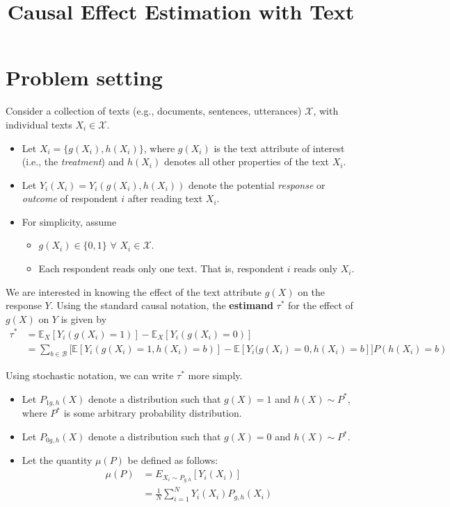 \documentclass{article}
\title{Causal Effect Estimation with Text}
\author{}
\date{}
\begin{document}
	
\maketitle

\section{Problem setting}

Consider a collection of texts (e.g., documents, sentences, utterances) $\mathcal{X}$, with individual texts $X_i \in \mathcal{X}$.
\begin{itemize}
    \item Let $X_i = \{g(X_i), h(X_i)\}$, where $g(X_i)$ is the text attribute of interest (i.e., the \textit{treatment}) and $h(X_i)$ denotes all other properties of the text $X_i$. 
    \item Let $Y_i(X_i) = Y_i(g(X_i), h(X_i))$ denote the potential \textit{response} or \textit{outcome} of respondent $i$ after reading text $X_i$.
    \item For simplicity, assume
    \begin{itemize}
        \item $g(X_i) \in \{0, 1\}$ $\forall$ $X_i \in \mathcal{X}$.
        \item Each respondent reads only one text. That is, respondent $i$ reads only $X_i$.
    \end{itemize}
\end{itemize}

We are interested in knowing the effect of the text attribute $g(X)$ on the response $Y$. Using the standard causal notation, the \textbf{estimand} $\tau^*$ for the effect of $g(X)$ on $Y$ is given by
\begin{align*}
    \tau^* &= \mathbb{E}_X[Y_i(g(X_i)=1)] - \mathbb{E}_X[Y_i(g(X_i)=0)] \\
    &= \boxed{\sum_{b \in \mathcal{B}} \Big[ \mathbb{E}[Y_i(g(X_i)=1, h(X_i)=b)] - \mathbb{E}[Y_i(g(X_i)=0, h(X_i)=b] \Big]P(h(X_i)=b)}
\end{align*}

Using stochastic notation, we can write $\tau^*$ more simply.
\begin{itemize}
    \item Let $P_{1 g,h}(X)$ denote a distribution such that $g(X)=1$ and $h(X) \sim P^*$, where $P^*$ is some arbitrary probability distribution.
    \item Let $P_{0 g,h}(X)$ denote a distribution such that $g(X)=0$ and $h(X) \sim P^*$.
    \item Let the quantity $\mu(P)$ be defined as follows:
    \begin{align*}
        \mu(P) &= E_{X_i \sim P_{g,h}}[Y_i(X_i)] \\
        &= \frac{1}{N} \sum_{i=1}^N Y_i(X_i)P_{g,h}(X_i)
    \end{align*}
\end{itemize}
\end{document}
